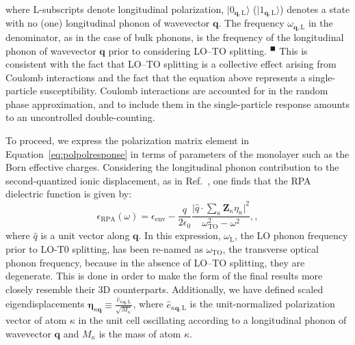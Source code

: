 \documentclass[aps,prb,twocolumn,
	           groupedaddress,superscriptaddress,
               amsfonts,amssymb,amsmath,floatfix,
	           citeautoscript]{revtex4-1}
\makeatletter
\newcommand{\eg}{e.g.\@\xspace}
\newcommand{\comment}[2]{%
    \ifbool{togglecomments}%
    {\textcolor{blue!70!black}{\small\textsf{%
    \textsuperscript{\textsc{\textsf{\MakeLowercase{#1}}}}%
    [#2]}}} %
    {}}     %
\newcommand{\citeremind}[1]{%
	\unskip%
    \textcolor{blue!75!black!80!yellow}{${}^\blacksquare$%
	\ifthenelse{\isempty{#1}}{}{\textsuperscript{\tiny\textsf{#1}}}%
	}\xspace}
\makeatother
\begin{document}
where L-subscripts denote longitudinal polarization, $|0_{\mathbf{q},\mathrm{L}}\rangle$ ($|1_{\mathbf{q},\mathrm{L}}\rangle$) denotes a state with no (one) longitudinal phonon of wavevector $\mathbf{q}$. The frequency $\omega_{\mathbf{q},\mathrm{L}}$ in the denominator, as in the case of bulk phonons, is the frequency of the longitudinal phonon of wavevector $\mathbf{q}$ prior to considering LO--TO splitting.\citeremind{}
This is consistent with the fact that LO--TO splitting is a collective effect arising from Coulomb interactions and the fact that the equation above represents a single-particle susceptibility. Coulomb interactions are accounted for in the random phase approximation, and to include them in the single-particle response amounts to an uncontrolled double-counting. 

To proceed, we express the polarization matrix element in Equation~\eqref{eq:polpolresponse} in terms of parameters of the monolayer such as the Born effective charges. 
Considering the longitudinal phonon contribution to the second-quantized ionic displacement, as in Ref.~, one finds that the RPA dielectric function is given by:
\begin{equation}
    \epsilon_{\mathrm{RPA}}(\omega) = \epsilon_{\mathrm{env}} - \frac{q}{2\epsilon_0}\frac{\big|\hat{q}\cdot\sum_{\kappa} \mathbf{Z}_{\kappa}\eta_{\kappa}  \big|^2}{\omega^2_{\mathrm{TO}}-\omega^2},
    \label{eq:epsRPA},
\end{equation}
  where $\hat{q}$ is a unit vector along $\mathbf{q}$. In this expression, $\omega_\mathrm{L}$, the LO phonon frequency prior to LO-T0 splitting, has been re-named as $\omega_{\mathrm{TO}}$, the transverse optical phonon frequency, because in the absence of LO--TO splitting, they are degenerate. This is done in order to make the form of the final results more closely resemble their 3D counterparts. 
Additionally, we have defined scaled eigendisplacements $\boldsymbol{\eta}_{\kappa\mathbf{q}}\equiv \frac{\hat{e}_{\kappa\mathbf{q},\mathrm{L}}}{\sqrt{M_{\kappa}}}$, where $\hat{e}_{\kappa\mathbf{q},\mathrm{L}}$ is the unit-normalized polarization vector of atom $\kappa$ in the unit cell oscillating according to a longitudinal phonon of wavevector $\mathbf{q}$ and $M_{\kappa}$ is the mass of atom $\kappa$.

  
\end{document}
